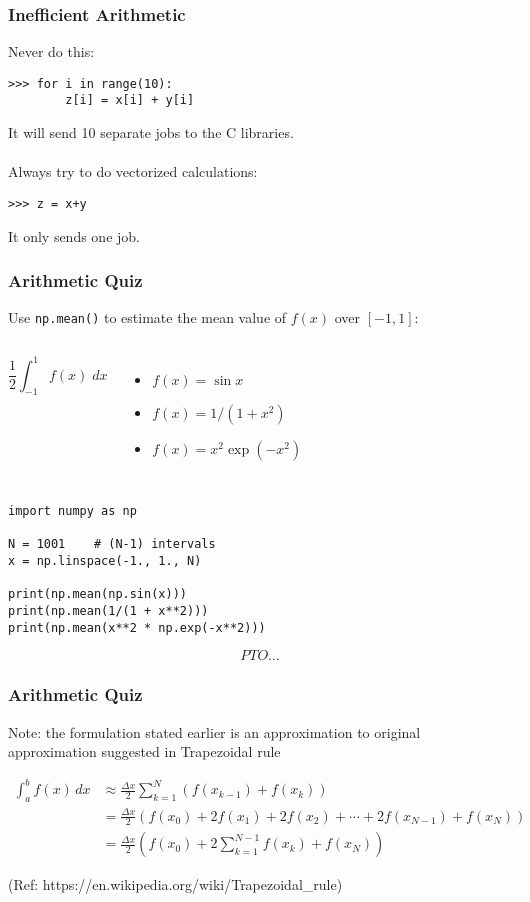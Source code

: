\begin{frame}[fragile]
    \frametitle{Inefficient Arithmetic}

    Never do this:
    \begin{lstlisting}
>>> for i in range(10):
        z[i] = x[i] + y[i]
    \end{lstlisting}
    It will send 10 separate jobs to the C libraries.
    \\~\\
    Always try to do vectorized calculations:
    \begin{lstlisting}
>>> z = x+y
    \end{lstlisting}
    It only sends one job.
\end{frame}

\begin{frame}[fragile]\frametitle{Arithmetic Quiz}

    Use \lstinline|np.mean()| to estimate the mean value of $f(x)$ over $[-1,1]$:

    \begin{columns}
            \[ \frac{1}{2} \int_{-1}^{1} f(x) \; dx \]
            \begin{itemize}
                \item $f(x) = \sin x$
                \item $f(x) = 1/(1 + x^2)$
                \item $f(x) = x^2 \exp(-x^2)$
            \end{itemize}
    \end{columns}
    \begin{lstlisting}
import numpy as np

N = 1001    # (N-1) intervals
x = np.linspace(-1., 1., N)

print(np.mean(np.sin(x)))
print(np.mean(1/(1 + x**2)))
print(np.mean(x**2 * np.exp(-x**2)))
    \end{lstlisting}
	
\[PTO \ldots\]
\end{frame}

\begin{frame}[fragile]\frametitle{Arithmetic Quiz}

Note: the formulation stated earlier is an approximation to original approximation suggested in Trapezoidal rule

\begin{align*}
\int_{a}^{b} f(x)\, dx & \approx \frac{\Delta x}{2} \sum_{k=1}^{N} \left( f(x_{k-1}) + f(x_{k}) \right) \\
&= \frac{\Delta x}{2} ( f(x_0) + 2f(x_1) + 2f(x_2) + \dotsb + 2f(x_{N-1}) + f(x_N) )\\
&= \frac{\Delta x}{2} \left( f(x_0) + 2\sum_{k=1}^{N-1} f(x_k) + f(x_N) \right) 
\end{align*}

(Ref: https://en.wikipedia.org/wiki/Trapezoidal\_rule)
\end{frame}


